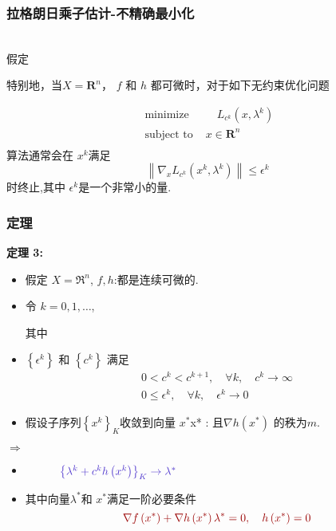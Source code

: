 \documentclass[handout,10pt]{beamer} %
\begin{document}
\begin{frame}
\frametitle{拉格朗日乘子估计-不精确最小化}
\\
假定 


 特别地，当$X=\mathbf{R}^{n}$， $f$ 和 $h$ 都可微时，对于如下无约束优化问题

     \begin{equation}
		\begin{array}{ll}
		\text{ minimize } & \quad L_{c^{k}}\left(x, \lambda^{k}\right) \\
		\text { subject to } &x \in \mathbf{R}^{n}\\
		
		\end{array}
	\end{equation}
算法通常会在 $x^{k}$满足
$$
\left\|\nabla_{x} L_{c^{k}}\left(x^{k}, \lambda^{k}\right)\right\| \leq \epsilon^{k}
$$
时终止,其中 $\epsilon^{k}$是一个非常小的量.
\end{frame}

\begin{frame}
\frametitle{定理}
\textbf{定理 3:}
\begin{itemize}
  \item
假定  $X=\Re^{n}$,   $f,h$:都是连续可微的.

\item 令 $k=0,1, \ldots$,  

其中 
\item $\left\{\epsilon^{k}\right\}$ 和 $\left\{c^{k}\right\}$ 满足
$$
\begin{array}{c}
0<c^{k}<c^{k+1}, \quad \forall k, \quad c^{k} \rightarrow \infty \\
0 \leq \epsilon^{k}, \quad \forall k, \quad \epsilon^{k} \rightarrow 0
\end{array}
$$
\item 假设子序列$\left\{x^{k}\right\}_{K}$收敛到向量 $ x^{*}$x* : 且$\nabla h\left(x^{*}\right)$ 的秩为$m$.
   \end{itemize}
    $\Rightarrow$
    \begin{itemize}
      \item
$
 \hspace{7ex}
\hint{\left\{\lambda^{k}+c^{k} h\left(x^{k}\right)\right\}_{K} \rightarrow \lambda^{*}}
$

\item 其中向量$\lambda^{*}$和 $x^{*}$满足一阶必要条件
$$
\dred{\nabla f\left(x^{*}\right)+\nabla h\left(x^{*}\right) \lambda^{*}=0, \quad h\left(x^{*}\right)=0}
$$
    \end{itemize}
\end{frame}
\end{document}
